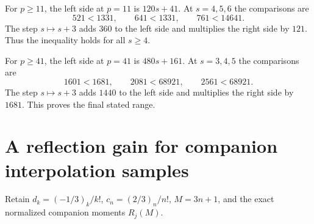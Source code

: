 \documentclass[11pt,letterpaper]{article}
\numberwithin{equation}{section}
\begin{document}
For $p\ge11$, the left side at $p=11$ is $120s+41$.
At $s=4,5,6$ the comparisons are
\[
 521<1331,\qquad641<1331,\qquad761<14641.
\]
The step $s\mapsto s+3$ adds $360$ to the left side and multiplies
the right side by $121$. Thus the inequality holds for all $s\ge4$.

For $p\ge41$, the left side at $p=41$ is $480s+161$.
At $s=3,4,5$ the comparisons are
\[
 1601<1681,\qquad2081<68921,\qquad2561<68921.
\]
The step $s\mapsto s+3$ adds $1440$ to the left side and multiplies
the right side by $1681$. This proves the final stated range.


\section{A reflection gain for companion interpolation samples}\label{loc-VII-11}
\label{VII-sec:e-companion-sample-gain}
Retain $d_k=(-1/3)_k/k!$, $c_n=(2/3)_n/n!$, $M=3n+1$,
and the exact normalized companion moments $R_j(M)$.
\end{document}
